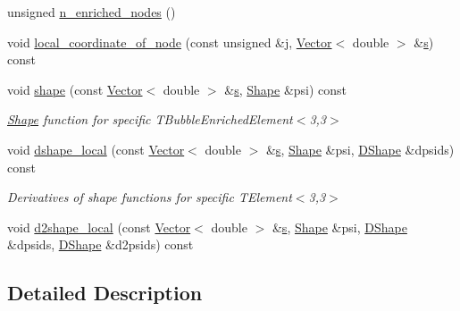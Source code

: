\begin{DoxyCompactItemize}
\item 
unsigned \hyperlink{classoomph_1_1TBubbleEnrichedElementShape_3_013_00_013_01_4_a7cf9479753a219f77b27957e35f132ce}{n\+\_\+enriched\+\_\+nodes} ()
\item 
void \hyperlink{classoomph_1_1TBubbleEnrichedElementShape_3_013_00_013_01_4_a19e1c62b5fb4e91c8b5808a522e0110c}{local\+\_\+coordinate\+\_\+of\+\_\+node} (const unsigned \&j, \hyperlink{classoomph_1_1Vector}{Vector}$<$ double $>$ \&\hyperlink{cfortran_8h_ab7123126e4885ef647dd9c6e3807a21c}{s}) const
\item 
void \hyperlink{classoomph_1_1TBubbleEnrichedElementShape_3_013_00_013_01_4_ad05cd356fbb394446643ac8f8e02e1be}{shape} (const \hyperlink{classoomph_1_1Vector}{Vector}$<$ double $>$ \&\hyperlink{cfortran_8h_ab7123126e4885ef647dd9c6e3807a21c}{s}, \hyperlink{classoomph_1_1Shape}{Shape} \&psi) const
\begin{DoxyCompactList}\small\item\em \hyperlink{classoomph_1_1Shape}{Shape} function for specific T\+Bubble\+Enriched\+Element$<$3,3$>$ \end{DoxyCompactList}\item 
void \hyperlink{classoomph_1_1TBubbleEnrichedElementShape_3_013_00_013_01_4_aac68cab20840e2bfee3af7a23d59dcb0}{dshape\+\_\+local} (const \hyperlink{classoomph_1_1Vector}{Vector}$<$ double $>$ \&\hyperlink{cfortran_8h_ab7123126e4885ef647dd9c6e3807a21c}{s}, \hyperlink{classoomph_1_1Shape}{Shape} \&psi, \hyperlink{classoomph_1_1DShape}{D\+Shape} \&dpsids) const
\begin{DoxyCompactList}\small\item\em Derivatives of shape functions for specific T\+Element$<$3,3$>$ \end{DoxyCompactList}\item 
void \hyperlink{classoomph_1_1TBubbleEnrichedElementShape_3_013_00_013_01_4_a6e43bca8652e876e0f0642934264f119}{d2shape\+\_\+local} (const \hyperlink{classoomph_1_1Vector}{Vector}$<$ double $>$ \&\hyperlink{cfortran_8h_ab7123126e4885ef647dd9c6e3807a21c}{s}, \hyperlink{classoomph_1_1Shape}{Shape} \&psi, \hyperlink{classoomph_1_1DShape}{D\+Shape} \&dpsids, \hyperlink{classoomph_1_1DShape}{D\+Shape} \&d2psids) const
\end{DoxyCompactItemize}


\subsection{Detailed Description}
